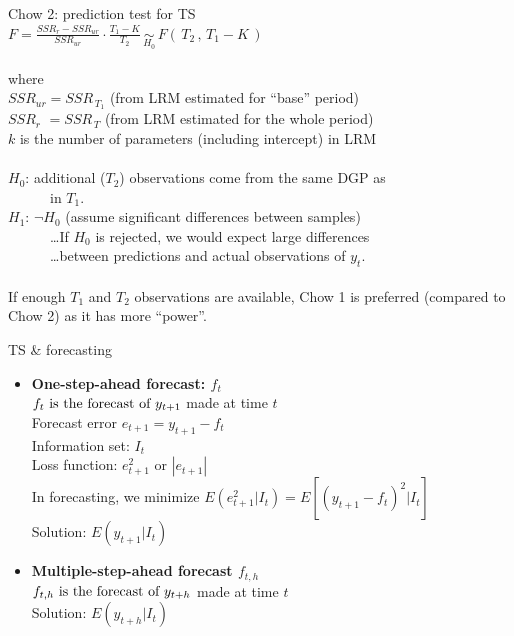 \documentclass{beamer}
\begin{document}
\begin{frame}{Chow 2: prediction test for TS}
~\\
$F = \frac{\textit{SSR}_{r}-\textit{SSR}_{ur}}{\textit{SSR}_{ur}}
   \cdot \frac{T_1-K}{T_2} \,
   \underset{H_0}{\sim} \,
   F(\,T_2 \,,\, T_1\!-\!K \, ) $ \\
~ \\
where\\
$\textit{SSR}_{ur} = \textit{SSR}_{\,T_1} $ (from LRM estimated for ``base'' period)\\
$\textit{SSR}_{r} \,\,= \textit{SSR}_{\,T}$  (from LRM estimated for the whole period)\\
$k$ is the number of parameters (including intercept) in LRM\\
~ \\
$H_0$: additional ($T_2$) observations come from the same DGP as\\ 
~~~~~~in $T_1$.\\
$H_1$: $\neg H_0$ (assume significant differences between samples)\\
~~~~~~\dots If $H_0$ is rejected, we would expect large differences\\
~~~~~~\dots between predictions and actual observations of $y_t$.\\
~ \\
\footnotesize{
If enough $T_1$ and $T_2$ observations are available, Chow 1 is preferred (compared to Chow 2) as it has more ``power''.}
\end{frame}
\begin{frame}{TS \& forecasting}
\begin{itemize}
\item \textbf{One-step-ahead forecast: $f_t$}\\
\smallskip
$f_t \textnormal{~is the forecast of~} y_{t+1}$ made at time $t$\\
Forecast error $e_{t+1}=y_{t+1}-f_t$\\
Information set: $I_t$\\
Loss function: $e^2_{t+1}$ or $|e_{t+1}|$\\
In forecasting, we minimize $E(e^2_{t+1}|I_t)=E[(y_{t+1}-f_t)^2|I_t]$\\
Solution: $E(y_{t+1}|I_t)$
\vspace{0.5cm}
\item \textbf{Multiple-step-ahead forecast $f_{t,h}$}\\
\smallskip
$f_{t,h} \textnormal{~is the forecast of~} y_{t+h}$ made at time $t$\\
Solution: $E(y_{t+h}|I_t)$
\end{itemize}
\end{frame}
\end{document}
